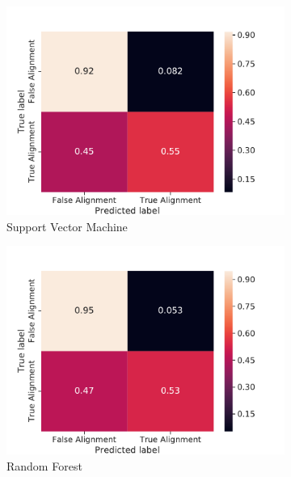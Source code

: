 \documentclass{article}
\begin{document}
\begin{figure}
\centering
\begin{subfigure}{.5\textwidth}
  \centering
  \includegraphics[width=\linewidth]{FinalProject/conf_SVM.pdf}
  \caption{Support Vector Machine}
  \label{fig:sub1}
\end{subfigure}%
\begin{subfigure}{.5\textwidth}
  \centering
  \includegraphics[width=\linewidth]{FinalProject/conf_Random_Forest.pdf}
  \caption{Random Forest}
  \label{fig:sub2}
\end{subfigure}
\begin{subfigure}{.5\textwidth}
  \centering

\end{subfigure}
\end{figure}
\end{document}
